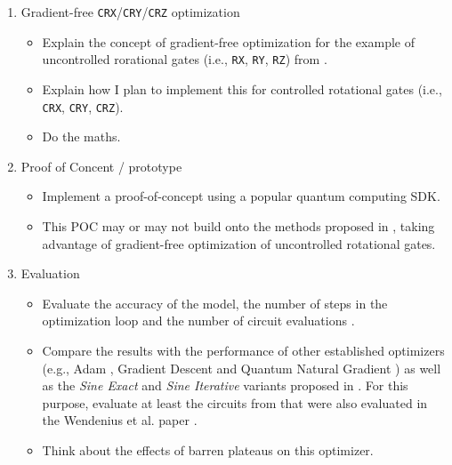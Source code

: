\begin{enumerate}
    \item Gradient-free \texttt{CRX}/\texttt{CRY}/\texttt{CRZ} optimization
    \begin{itemize}
        \item
            Explain the concept of gradient-free optimization for the example of
            uncontrolled rorational gates (i.e., \texttt{RX}, \texttt{RY},
            \texttt{RZ}) from \cite{wendenius_gradient-free_2023}.
        \item
            Explain how I plan to implement this for controlled rotational gates
            (i.e., \texttt{CRX}, \texttt{CRY}, \texttt{CRZ}).
        \item
            Do the maths.
    \end{itemize}

    \item Proof of Concent / prototype
    \begin{itemize}
        \item
            Implement a proof-of-concept using a popular quantum computing SDK.
        \item
            This POC may or may not build onto the methods proposed in
            \cite{wendenius_gradient-free_2023}, taking advantage of
            gradient-free optimization of uncontrolled rotational gates.
    \end{itemize}

    \item Evaluation
    \begin{itemize}
        \item
            Evaluate the accuracy of the model, the number of steps in the
            optimization loop and the number of circuit evaluations
            \cite{wendenius_gradient-free_2023}.
        \item
            Compare the results with the performance of other established
            optimizers (e.g., Adam \cite{kingma_adam_2017}, Gradient Descent and
            Quantum Natural Gradient \cite{stokes_quantum_2020}) as well as the
            \emph{Sine Exact} and \emph{Sine Iterative} variants proposed in
            \cite{wendenius_gradient-free_2023}.
            For this purpose, evaluate at least the circuits from
            \cite{sim_expressibility_2019} that were also evaluated in the
            Wendenius et al. paper \cite{wendenius_gradient-free_2023}.
        \item
            Think about the effects of barren plateaus on this optimizer.
    \end{itemize}


\end{enumerate}
